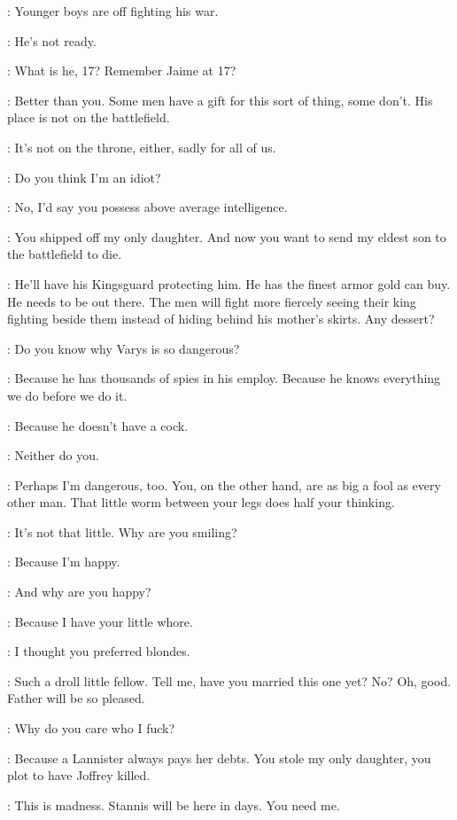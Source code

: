 \TYRION: Younger boys are off fighting his war. 

\CERSEI: He's not ready. 

\TYRION: What is he, 17? Remember Jaime at 17? 

\CERSEI: Better than you. Some men have a gift for this sort of thing, some don't. His place is not on the battlefield. 

\TYRION: It's not on the throne, either, sadly for all of us. 

\CERSEI: Do you think I'm an idiot? 

\TYRION: No, I'd say you possess above average intelligence. 

\CERSEI: You shipped off my only daughter. And now you want to send my eldest son to the battlefield to die. 

\TYRION: He'll have his Kingsguard protecting him. He has the finest armor gold can buy. He needs to be out there. The men will fight more fiercely seeing their king fighting beside them instead of hiding behind his mother's skirts. Any dessert? 

\CERSEI: Do you know why Varys is so dangerous? 

\TYRION: Because he has thousands of spies in his employ. Because he knows everything we do before we do it. 

\CERSEI: Because he doesn't have a cock. 

\TYRION: Neither do you. 

\CERSEI: Perhaps I'm dangerous, too. You, on the other hand, are as big a fool as every other man. That little worm between your legs does half your thinking. 

\TYRION: It's not that little. Why are you smiling? 

\CERSEI: Because I'm happy. 

\TYRION: And why are you happy? 

\CERSEI: Because I have your little whore. 

\TYRION: I thought you preferred blondes. 

\CERSEI: Such a droll little fellow. Tell me, have you married this one yet? No? Oh, good. Father will be so pleased. 

\TYRION: Why do you care who I fuck? 

\CERSEI: Because a Lannister always pays her debts. You stole my only daughter, you plot to have Joffrey killed. 

\TYRION: This is madness. Stannis will be here in days. You need me. 

